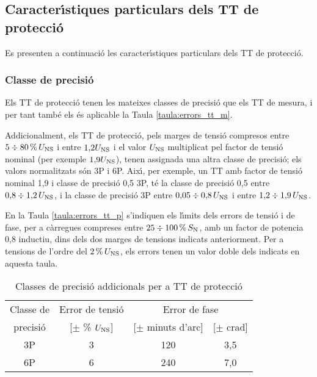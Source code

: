 \subsection{Caracter\'{\i}stiques particulars dels TT de protecci\'{o}}

Es presenten a continuaci\'{o} les caracter\'{\i}stiques particulars dels TT
de protecci\'{o}.

\subsubsection{Classe de precisi\'{o}}

 Els TT de protecci\'{o} tenen
les mateixes classes de precisi\'{o} que els TT de mesura, i per tant
tamb\'{e} els \'{e}s aplicable la Taula \vref{taula:errors_tt_m}.

Addicionalment, els TT de protecci\'{o}, pels marges de tensi\'{o}
compresos entre $5 \div 80\mathrm{\,\%} \,U_\mathrm{NS}$  i entre
$1{,}2 U_\mathrm{NS}$ i el valor $U_\mathrm{NS}$  multiplicat pel
factor de tensi\'{o} nominal (per exemple $1{,}9 U_\mathrm{NS}$), tenen
assignada una altra classe de precisi\'{o}; els valors normalitzats
s\'{o}n 3P i 6P. Aix\'{\i}, per exemple, un TT amb factor de tensi\'{o} nominal
1,9 i classe de precisi\'{o} 0,5 3P, t\'{e} la classe de precisi\'{o} 0,5 entre
$0{,}8 \div 1{,}2 \,U_\mathrm{NS}$, i la classe de precisi\'{o} 3P
entre $0{,}05 \div 0{,}8 \,U_\mathrm{NS}$ i entre
$1{,}2 \div 1{,}9 \,U_\mathrm{NS}$.

En la Taula \vref{taula:errors_tt_p} s'indiquen els l\'{\i}mits dels
errors de tensi\'{o} i  de fase, per a c\`{a}rregues compreses entre $25
\div 100\mathrm{\,\%} \,S_\mathrm{N}$, amb un factor de potencia 0,8
inductiu, dins dels dos marges de tensions indicats anteriorment.
Per a tensions de l'ordre del $2\mathrm{\,\%} \,U_\mathrm{NS}$, els errors
tenen un valor doble dels indicats en aquesta taula.

\begin{table}[htb]
   \caption{\label{taula:errors_tt_p} Classes de precisi\'{o} addicionals per a TT de protecci\'{o}}
   \begin{center}\begin{tabular}{cccc}
   \toprule[1pt]
   Classe de & Error de tensi\'{o} & \multicolumn{2}{c}{Error de fase} \\
   \cmidrule(rl){3-4}
   precisi\'{o} &  [$\pm$ \% $U_\mathrm{NS}$] & [$\pm$ minuts d'arc]  & [$\pm$ crad] \\
   \midrule
   3P & 3 & 120 & 3,5 \\
   6P & 6 & 240 & 7,0 \\
   \bottomrule[1pt]
   \end{tabular} \end{center}
\end{table}

